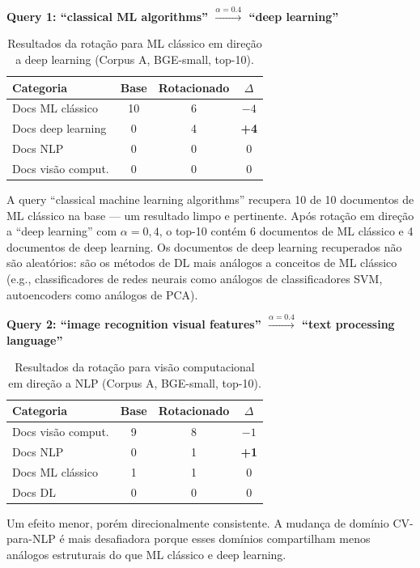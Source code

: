 \documentclass{article}
\begin{document}
\textbf{Query 1: ``classical ML algorithms'' $\xrightarrow{\alpha=0.4}$ ``deep learning''}

\begin{table}[ht]
\centering
\caption{Resultados da rotação para ML clássico em direção a deep learning (Corpus A, BGE-small, top-10).}
\label{tab:exp3a}
\begin{tabular}{lccc}
\toprule
Categoria & Base & Rotacionado & $\Delta$ \\
\midrule
Docs ML clássico & 10 & 6 & $-4$ \\
Docs deep learning & 0 & 4 & \textbf{+4} \\
Docs NLP & 0 & 0 & 0 \\
Docs visão comput. & 0 & 0 & 0 \\
\bottomrule
\end{tabular}
\end{table}

A query ``classical machine learning algorithms'' recupera 10 de 10 documentos de ML clássico na base --- um resultado limpo e pertinente. Após rotação em direção a ``deep learning'' com $\alpha = 0{,}4$, o top-10 contém 6 documentos de ML clássico e 4 documentos de deep learning. Os documentos de deep learning recuperados não são aleatórios: são os métodos de DL mais análogos a conceitos de ML clássico (e.g., classificadores de redes neurais como análogos de classificadores SVM, autoencoders como análogos de PCA).

\textbf{Query 2: ``image recognition visual features'' $\xrightarrow{\alpha=0.4}$ ``text processing language''}

\begin{table}[ht]
\centering
\caption{Resultados da rotação para visão computacional em direção a NLP (Corpus A, BGE-small, top-10).}
\label{tab:exp3b}
\begin{tabular}{lccc}
\toprule
Categoria & Base & Rotacionado & $\Delta$ \\
\midrule
Docs visão comput. & 9 & 8 & $-1$ \\
Docs NLP & 0 & 1 & \textbf{+1} \\
Docs ML clássico & 1 & 1 & 0 \\
Docs DL & 0 & 0 & 0 \\
\bottomrule
\end{tabular}
\end{table}

Um efeito menor, porém direcionalmente consistente. A mudança de domínio CV-para-NLP é mais desafiadora porque esses domínios compartilham menos análogos estruturais do que ML clássico e deep learning.
\end{document}
